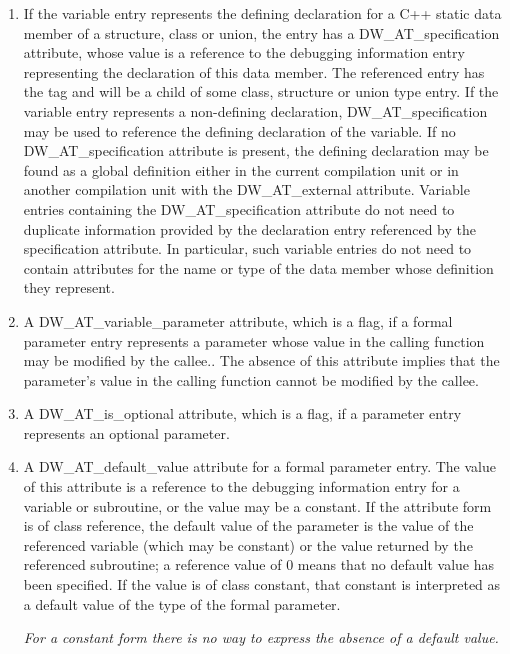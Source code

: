 \begin{enumerate}[1.]
\item If the variable entry represents the defining declaration
for a C++ static data member of a structure, class or union,
the entry has a DW\_AT\_specification attribute, whose value is a
reference to the debugging information entry representing the
declaration of this data member. The referenced entry has the
tag  and will be a child of some class, structure
or union type entry.  If the variable entry represents a
non-defining declaration, DW\_AT\_specification may be used
to reference the defining declaration of the variable. If
no DW\_AT\_specification attribute is present, the defining
declaration may be found as a global definition either in the
current compilation unit or in another compilation unit with
the DW\_AT\_external attribute.  Variable entries containing
the DW\_AT\_specification attribute do not need to duplicate
information provided by the declaration entry referenced by
the specification attribute. In particular, such variable
entries do not need to contain attributes for the name or
type of the data member whose definition they represent.

\item A DW\_AT\_variable\_parameter attribute, which is a flag,
if a formal parameter entry represents a parameter whose
value in the calling function may be modified by the callee..
The absence of this attribute implies that the parameter’s
value in the calling function cannot be modified by the callee.

\item A DW\_AT\_is\_optional attribute, which is a flag, if a
parameter entry represents an optional parameter.

\item A DW\_AT\_default\_value attribute for a formal parameter
entry. The value of this attribute is a reference to the
debugging information entry for a variable or subroutine,
or the value may be a constant. If the attribute form is of
class reference, the default value of the parameter is the
value of the referenced variable (which may be constant) or
the value returned by the referenced subroutine; a reference
value of 0 means that no default value has been specified.
If the value is of class constant, that constant is interpreted
as a default value of the type of the formal parameter.

\textit{For a constant form there is no way to 
express the absence of a default value.}


\end{enumerate}
